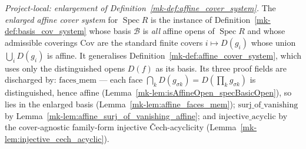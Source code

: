 \begin{definition}\label{mk-def:affine_cover_system_general}
  \leanok

  \textit{Project-local: enlargement of Definition~\ref{mk-def:affine_cover_system}.}
  The \emph{enlarged affine cover system} for \(\operatorname{Spec} R\) is the instance of
  Definition~\ref{mk-def:basis_cov_system} whose basis \(\mathcal{B}\) is \emph{all} affine opens of
  \(\operatorname{Spec} R\) and whose admissible coverings \(\mathrm{Cov}\) are the standard finite covers
  \(i \mapsto D(g_i)\) whose union \(\bigcup_i D(g_i)\) is affine. It generalises
  Definition~\ref{mk-def:affine_cover_system}, which uses only the distinguished opens \(D(f)\) as its basis.
  Its three proof fields are discharged by: \(\mathrm{faces\_mem}\) --- each face
  \(\bigcap_k D(g_{\sigma k}) = D(\prod_k g_{\sigma k})\) is distinguished, hence affine
  (Lemma~\ref{mk-lem:isAffineOpen_specBasicOpen}), so lies in the enlarged basis
  (Lemma~\ref{mk-lem:affine_faces_mem}); \(\mathrm{surj\_of\_vanishing}\) by
  Lemma~\ref{mk-lem:affine_surj_of_vanishing_affine}; and \(\mathrm{injective\_acyclic}\) by the cover-agnostic
  family-form injective {\v C}ech-acyclicity (Lemma~\ref{mk-lem:injective_cech_acyclic}).
\end{definition}

